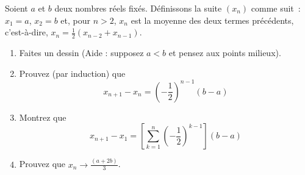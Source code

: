 
\begin{exercice}\label{exo0021}

Soient $a$ et $b$ deux nombres réels fixés. Définissons la suite $\left(x_n\right)$ comme suit~: $x_1=a$, $x_2=b$ et, pour $n>2$, $x_n$ est la moyenne des deux termes précédents, c'est-à-dire, $x_n=\frac{1}{2}\left(x_{n-2}+x_{n-1}\right)$.
\begin{enumerate}
	\item Faites un dessin (Aide : supposez $a<b$ et pensez aux points milieux).
	\item Prouvez (par induction) que $$x_{n+1}-x_n=\left(-\frac{1}{2}\right)^{n-1}\left(b-a\right)$$
	\item Montrez que $$x_{n+1}-x_1=\left[\sum_{k=1}^n\left(-\frac{1}{2}\right)^{k-1}\right]\left(b-a\right)$$
	\item Prouvez que $x_n\rightarrow \frac{\left(a+2b\right)}{3}$.
\end{enumerate}

\end{exercice}
